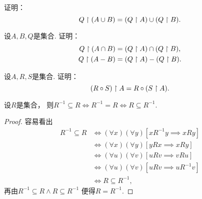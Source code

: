 \begin{example}
证明：\begin{equation}
	Q \upharpoonright (A \cup B)
	= (Q \upharpoonright A)\cup(Q \upharpoonright B).
\end{equation}
\end{example}

\begin{example}
设\(A,B,Q\)是集合.
证明：\begin{gather}
	Q \upharpoonright (A \cap B)
	= (Q \upharpoonright A) \cap (Q \upharpoonright B), \\
	Q \upharpoonright (A - B)
	= (Q \upharpoonright A)
	- (Q \upharpoonright B).
\end{gather}
\end{example}

\begin{example}
设\(A,R,S\)是集合.
证明：\begin{equation}
	(R \circ S) \upharpoonright A = R \circ (S \upharpoonright A).
\end{equation}
\end{example}

\begin{proposition}\label{theorem:集合论.与逆相等的充分必要条件}
设\(R\)是集合，
则\(R^{-1} \subseteq R
\iff R^{-1} = R
\iff R \subseteq R^{-1}\).
\begin{proof}
容易看出\begin{align*}
	R^{-1} \subseteq R
	&\iff
	(\forall x)(\forall y)[xR^{-1}y \implies xRy] \\
	&\iff
	(\forall x)(\forall y)[yRx \implies xRy] \\
	&\iff
	(\forall u)(\forall v)[uRv \implies vRu] \\
	&\iff
	(\forall u)(\forall v)[uRv \implies uR^{-1}v] \\
	&\iff
	R \subseteq R^{-1},
\end{align*}
再由\(R^{-1} \subseteq R \land R \subseteq R^{-1}\)
便得\(R = R^{-1}\).
\end{proof}
\end{proposition}

